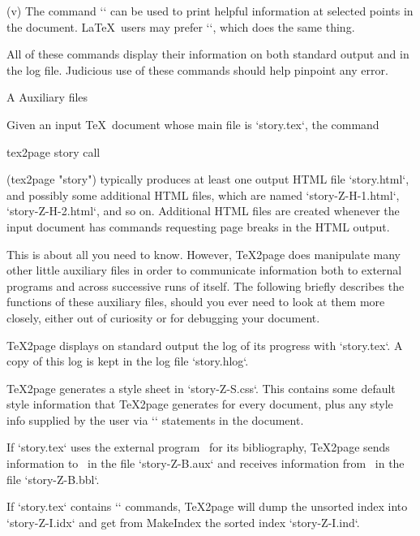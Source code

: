 \item(v) The command `\message`
can be used to print helpful information at selected
points in the document.   \LaTeX\ users may
prefer `\typeout`, which does the same thing.

All of these commands display their information
on both standard output and in the log file.
Judicious use of these commands
should help pinpoint any error.

\beginchapter A  Auxiliary files

%
Given an input \TeX\ document whose main file is
`story.tex`, the
\ifx\inpltdist\Undefined
command

\begintt
tex2page story
\endtt
\else
call

\begintts
(tex2page "story")
\endtt
\fi
%
typically produces at least one
output HTML file `story.html`, and possibly some
additional HTML files, which are named
`story-Z-H-1.html`, `story-Z-H-2.html`, and
so on.  Additional HTML files are created whenever the
input document has commands requesting page
breaks in the HTML output.

This is about all you need to know.  However, \TeX2page
does manipulate many other little auxiliary files in order to
communicate information both to external programs and
across successive runs of itself.  The following
briefly describes the functions of these auxiliary
files, should you ever need to look at them more
closely, either out of curiosity or for debugging your
document.

\TeX2page displays on standard output the log of
its progress with `story.tex`.  A copy of this
log is kept in the log
file `story.hlog`.

\TeX2page generates a style sheet in
`story-Z-S.css`.  This contains some default style
information that \TeX2page generates for every document,
plus any style info supplied by the user via
`\cssblock` statements in the document.


If `story.tex` uses the external program \BibTeX\ for
its bibliography, \TeX2page sends information to \BibTeX\
in the file `story-Z-B.aux` and receives information
from \BibTeX\ in the file `story-Z-B.bbl`.


If `story.tex` contains `\index` commands, \TeX2page
will dump the unsorted index into `story-Z-I.idx` and
get from MakeIndex the sorted index `story-Z-I.ind`.

